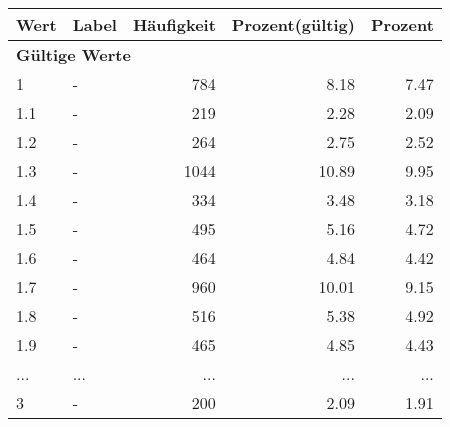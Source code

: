     \begin{longtable}{lXrrr}
     \toprule
     \textbf{Wert} & \textbf{Label} & \textbf{Häufigkeit} & \textbf{Prozent(gültig)} & \textbf{Prozent} \\
     \endhead
     \midrule
     \multicolumn{5}{l}{\textbf{Gültige Werte}}\\
        1 & \multicolumn{1}{X}{-} & %
          \num{784} &
          \num[round-mode=places,round-precision=2]{8.18} &
          \num[round-mode=places,round-precision=2]{7.47} \\
        1.1 & \multicolumn{1}{X}{-} & %
          \num{219} &
          \num[round-mode=places,round-precision=2]{2.28} &
          \num[round-mode=places,round-precision=2]{2.09} \\
        1.2 & \multicolumn{1}{X}{-} & %
          \num{264} &
          \num[round-mode=places,round-precision=2]{2.75} &
          \num[round-mode=places,round-precision=2]{2.52} \\
        1.3 & \multicolumn{1}{X}{-} & %
          \num{1044} &
          \num[round-mode=places,round-precision=2]{10.89} &
          \num[round-mode=places,round-precision=2]{9.95} \\
        1.4 & \multicolumn{1}{X}{-} & %
          \num{334} &
          \num[round-mode=places,round-precision=2]{3.48} &
          \num[round-mode=places,round-precision=2]{3.18} \\
        1.5 & \multicolumn{1}{X}{-} & %
          \num{495} &
          \num[round-mode=places,round-precision=2]{5.16} &
          \num[round-mode=places,round-precision=2]{4.72} \\
        1.6 & \multicolumn{1}{X}{-} & %
          \num{464} &
          \num[round-mode=places,round-precision=2]{4.84} &
          \num[round-mode=places,round-precision=2]{4.42} \\
        1.7 & \multicolumn{1}{X}{-} & %
          \num{960} &
          \num[round-mode=places,round-precision=2]{10.01} &
          \num[round-mode=places,round-precision=2]{9.15} \\
        1.8 & \multicolumn{1}{X}{-} & %
          \num{516} &
          \num[round-mode=places,round-precision=2]{5.38} &
          \num[round-mode=places,round-precision=2]{4.92} \\
        1.9 & \multicolumn{1}{X}{-} & %
          \num{465} &
          \num[round-mode=places,round-precision=2]{4.85} &
          \num[round-mode=places,round-precision=2]{4.43} \\
       ... & ... & ... & ... & ... \\
        3 & \multicolumn{1}{X}{-} & %
          \num{200} &
          \num[round-mode=places,round-precision=2]{2.09} &
          \num[round-mode=places,round-precision=2]{1.91} \\


\end{longtable}
